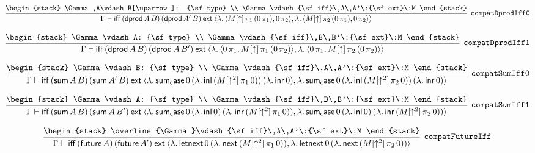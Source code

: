 \[
\infer[{\tt compatDprodIff0}]{\Gamma \vdash {\sf iff}\,({\sf dprod}\,A\,B)\,({\sf dprod}\,A'\,B)\:{\sf ext}\:\langle \lambda .\,\langle M[\uparrow ]\, \pi_1\,(0\, \pi_1),0\, \pi_2\rangle ,\lambda .\,\langle M[\uparrow ]\, \pi_2\,(0\, \pi_1),0\, \pi_2\rangle \rangle }{
\begin{stack}
\Gamma ,A\vdash B[\uparrow ]: {\sf type}
\\
\Gamma \vdash {\sf iff}\,A\,A'\:{\sf ext}\:M
\end{stack}}
\]

\[
\infer[{\tt compatDprodIff1}]{\Gamma \vdash {\sf iff}\,({\sf dprod}\,A\,B)\,({\sf dprod}\,A\,B')\:{\sf ext}\:\langle \lambda .\,\langle 0\, \pi_1,M[\uparrow ]\, \pi_1\,(0\, \pi_2)\rangle ,\lambda .\,\langle 0\, \pi_1,M[\uparrow ]\, \pi_2\,(0\, \pi_2)\rangle \rangle }{
\begin{stack}
\Gamma \vdash A: {\sf type}
\\
\Gamma \vdash {\sf iff}\,B\,B'\:{\sf ext}\:M
\end{stack}}
\]

\[
\infer[{\tt compatSumIff0}]{\Gamma \vdash {\sf iff}\,({\sf sum}\,A\,B)\,({\sf sum}\,A'\,B)\:{\sf ext}\:\langle \lambda .\,{\sf sum_case}\,0\,(\lambda .\,{\sf inl}\,(M[\uparrow^2]\, \pi_1\,0))\,(\lambda .\,{\sf inr}\,0),\lambda .\,{\sf sum_case}\,0\,(\lambda .\,{\sf inl}\,(M[\uparrow^2]\, \pi_2\,0))\,(\lambda .\,{\sf inr}\,0)\rangle }{
\begin{stack}
\Gamma \vdash B: {\sf type}
\\
\Gamma \vdash {\sf iff}\,A\,A'\:{\sf ext}\:M
\end{stack}}
\]

\[
\infer[{\tt compatSumIff1}]{\Gamma \vdash {\sf iff}\,({\sf sum}\,A\,B)\,({\sf sum}\,A\,B')\:{\sf ext}\:\langle \lambda .\,{\sf sum_case}\,0\,(\lambda .\,{\sf inl}\,0)\,(\lambda .\,{\sf inr}\,(M[\uparrow^2]\, \pi_1\,0)),\lambda .\,{\sf sum_case}\,0\,(\lambda .\,{\sf inl}\,0)\,(\lambda .\,{\sf inr}\,(M[\uparrow^2]\, \pi_2\,0))\rangle }{
\begin{stack}
\Gamma \vdash A: {\sf type}
\\
\Gamma \vdash {\sf iff}\,B\,B'\:{\sf ext}\:M
\end{stack}}
\]

\[
\infer[{\tt compatFutureIff}]{\Gamma \vdash {\sf iff}\,({\sf future}\,A)\,({\sf future}\,A')\:{\sf ext}\:\langle \lambda .\,{\sf letnext}\,0\,(\lambda .\,{\sf next}\,(M[\uparrow^2]\, \pi_1\,0)),\lambda .\,{\sf letnext}\,0\,(\lambda .\,{\sf next}\,(M[\uparrow^2]\, \pi_2\,0))\rangle }{
\begin{stack}
\overline{\Gamma}\vdash {\sf iff}\,A\,A'\:{\sf ext}\:M
\end{stack}}
\]

